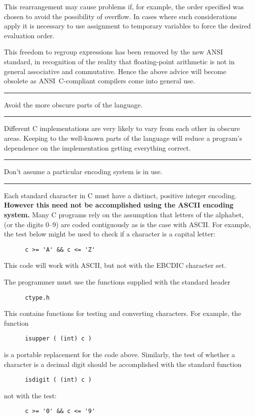 \documentclass[twoside,11pt]{article}
\newcounter{sruleno}
\newcommand{\srule}[1]{
    \addtocounter{sruleno}{1}
    \goodbreak
    \rule[0.5ex]{\textwidth}{0.3mm}
    {\Large #1 \hfill {\thesruleno}}
    \rule[0.5ex]{\textwidth}{0.1mm}
}
\newcommand{\srule}[1]{
       \addtocounter{sruleno}{1}
       \begin{rawhtml} <HR> \end{rawhtml}
       {\Large \thesruleno}~~~~{\Large #1}
       \begin{rawhtml} <HR> \end{rawhtml}
       \end{tabular}
  }
\begin{document}
This rearrangement may cause problems if, for example, the order 
specified was chosen to avoid the possibility of overflow.
In cases where such considerations apply
it is necessary to use assignment to temporary variables to force the 
desired evaluation order.


This freedom to regroup expressions has been removed by the 
new ANSI standard, in 
recognition of the reality that floating-point arithmetic is not in general
associative and commutative. Hence the above advice will become obsolete as 
ANSI~C-compliant compilers come into general use.



\srule{Avoid the more obscure parts of the language.}
Different C implementations are very likely to vary from each other 
in obscure areas.
Keeping to the well-known parts of the language will reduce a 
program's dependence on the implementation getting everything correct.


\srule{Don't assume a particular encoding system is in use.}
Each standard character in C must have a distinct, positive integer encoding.
{\bf However this need not be accomplished using the ASCII encoding system.}
Many C programs rely on the assumption that letters of the alphabet,
(or the digits 0--9) are coded contiguously as is the case with ASCII.
For example, the test below might be used to check if a character is 
a capital letter:
\begin{verbatim}
      c >= 'A' && c <= 'Z'
\end{verbatim}
This code will work with ASCII, but not with the EBCDIC character set.

The programmer must use the functions supplied with the standard 
header 
\begin{verbatim}
      ctype.h
\end{verbatim}
This contains functions for testing and converting characters.  For example,
the function 
\begin{verbatim}
      isupper ( (int) c )
\end{verbatim} 
is a portable replacement for the code above.
Similarly, the test of whether a character is a decimal digit 
should be accomplished with the standard function 
\begin{verbatim}
      isdigit ( (int) c )
\end{verbatim}
not with the test: 
\begin{verbatim}
      c >= '0' && c <= '9'
\end{verbatim}
\end{document}
